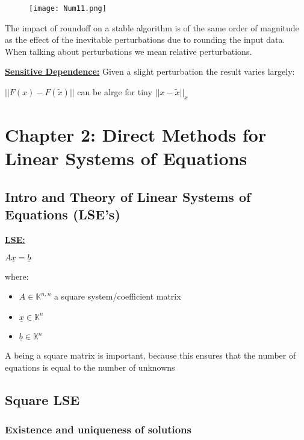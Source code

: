 \documentclass[8pt]{extreport}
\begin{document}
\begin{figure}[H]
\centering
\texttt{[image: Num11.png]}
\end{figure}


The impact of roundoff on a stable algorithm is of the same order of magnitude as the effect of the inevitable perturbations due to rounding the input data. When talking about perturbations we mean relative perturbations.

\underline{\textbf{Sensitive Dependence:}} Given a slight perturbation the result varies largely:
\begin{center}
$||F(x) - F(\tilde{x})||$ can be alrge for tiny $||x-\tilde{x}||_x$
\end{center}

 \chapter{Chapter 2: Direct Methods for Linear Systems of Equations}

\section{Intro and Theory of Linear Systems of Equations (LSE's)} 

\underline{\textbf{LSE:}}
\begin{center} 
$A \underline{x} = \underline{b}$
\end{center}
  where:
\begin{itemize}
\item $A \in \mathbb{K}^{n,n}$ a square system/coefficient matrix
\item $\underline{x} \in \mathbb{K}^n$
\item $\underline{b} \in \mathbb{K}^n$

\end{itemize}
A being a square matrix is important, because this ensures that the number of equations is equal to the number of unknowns

\section{ Square LSE}

\subsection{Existence and uniqueness of solutions}
\end{document}
